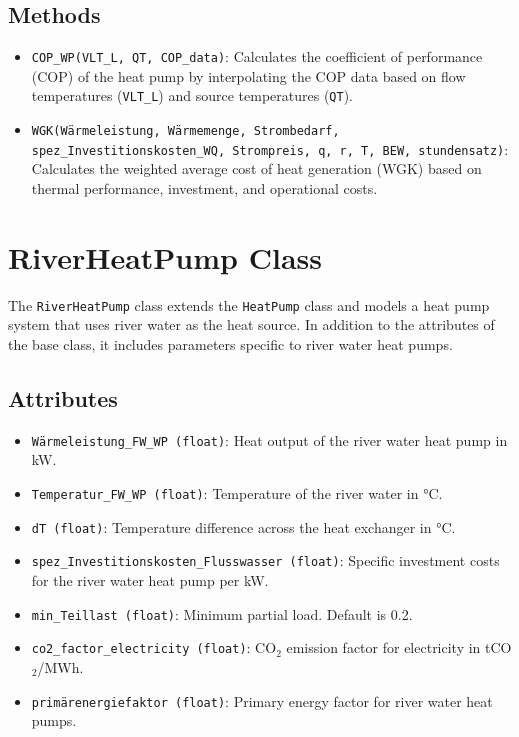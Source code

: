 \subsection{Methods}
\begin{itemize}
    \item \texttt{COP\_WP(VLT\_L, QT, COP\_data)}: Calculates the coefficient of performance (COP) of the heat pump by interpolating the COP data based on flow temperatures (\texttt{VLT\_L}) and source temperatures (\texttt{QT}).
    \item \texttt{WGK(Wärmeleistung, Wärmemenge, Strombedarf, spez\_Investitionskosten\_WQ, Strompreis, q, r, T, BEW, stundensatz)}: Calculates the weighted average cost of heat generation (WGK) based on thermal performance, investment, and operational costs.
\end{itemize}

\section{RiverHeatPump Class}
The \texttt{RiverHeatPump} class extends the \texttt{HeatPump} class and models a heat pump system that uses river water as the heat source. In addition to the attributes of the base class, it includes parameters specific to river water heat pumps.

\subsection{Attributes}
\begin{itemize}
    \item \texttt{Wärmeleistung\_FW\_WP (float)}: Heat output of the river water heat pump in kW.
    \item \texttt{Temperatur\_FW\_WP (float)}: Temperature of the river water in °C.
    \item \texttt{dT (float)}: Temperature difference across the heat exchanger in °C.
    \item \texttt{spez\_Investitionskosten\_Flusswasser (float)}: Specific investment costs for the river water heat pump per kW.
    \item \texttt{min\_Teillast (float)}: Minimum partial load. Default is 0.2.
    \item \texttt{co2\_factor\_electricity (float)}: CO$_2$ emission factor for electricity in tCO$_2$/MWh.
    \item \texttt{primärenergiefaktor (float)}: Primary energy factor for river water heat pumps.
\end{itemize}

